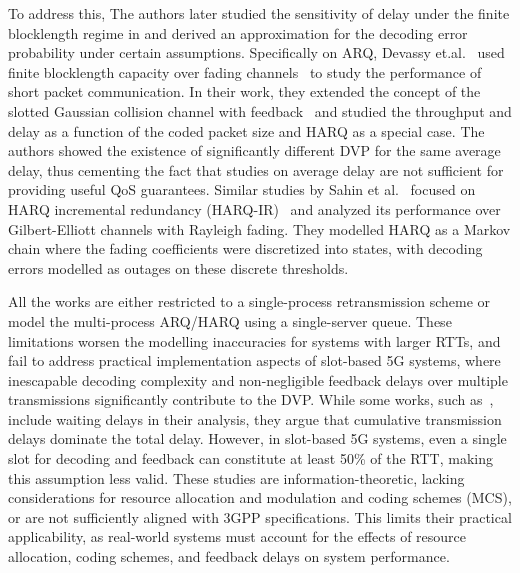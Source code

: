 To address this, The authors later studied the sensitivity of delay under the finite blocklength regime in \cite{schiessl2018delay} and derived an approximation for the decoding error probability under certain assumptions. 
Specifically on ARQ, Devassy et.al.~\cite{devassy2014finite,devassy2018delay,devassy2019reliable} used finite blocklength capacity over fading channels~\cite{polyanskiy2010FBL,polyanskiy2011feedback,Wei2013FBLblockfading} to study the performance of short packet communication.
In their work, they extended the concept of the slotted Gaussian collision channel with feedback~\cite{caire2000modulation,caire2001throughput} and studied the throughput and delay as a function of the coded packet size and HARQ as a special case. The authors showed the existence of significantly different DVP for the same average delay, thus cementing the fact that studies on average delay are not sufficient for providing useful QoS guarantees. Similar studies by Sahin et al.~\cite{Sahin2014Harq,Sahin2015Harq,Sahin2019Harq} focused on HARQ incremental redundancy (HARQ-IR)~\cite{DAHLMAN2014299} and analyzed its performance over Gilbert-Elliott channels with Rayleigh fading. They modelled HARQ as a Markov chain where the fading coefficients were discretized into states, with decoding errors modelled as outages on these discrete thresholds.


All the works are either restricted to a single-process retransmission scheme or model the multi-process ARQ/HARQ using a single-server queue. 
These limitations worsen the modelling inaccuracies for systems with larger RTTs, and fail to address practical implementation aspects of slot-based 5G systems, where inescapable decoding complexity and non-negligible feedback delays over multiple transmissions significantly contribute to the DVP.
While some works, such as~\cite{Sahin2019Harq}, include waiting delays in their analysis, they argue that cumulative transmission delays dominate the total delay. However, in slot-based 5G systems, even a single slot for decoding and feedback can constitute at least 50\% of the RTT, making this assumption less valid.
These studies are information-theoretic, lacking considerations for resource allocation and modulation and coding schemes (MCS), or are not sufficiently aligned with 3GPP specifications.
This limits their practical applicability, as real-world systems must account for the effects of resource allocation, coding schemes, and feedback delays on system performance.

